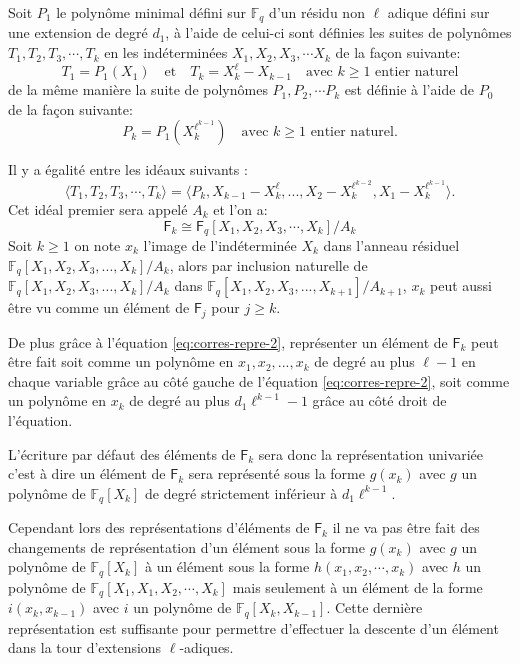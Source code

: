 \documentclass[10pt,a4paper]{book}
\theoremstyle{plain}
\theoremstyle{definition}
\theoremstyle{definition}
\theoremstyle{definition}
\theoremstyle{definition}
\theoremstyle{remark}
\theoremstyle{remark}
\theoremstyle{definition}
\begin{document}
Soit $P_1$ le polynôme minimal défini sur $\mathbb{F}_q$ d'un résidu non $\ell$ adique défini sur une extension de degré $d_1$, à l'aide de celui-ci sont définies les suites de polynômes $T_1,T_2,T_3,\cdots, T_k$ en les indéterminées $X_1,X_2,X_3, \cdots X_k$ de la façon suivante:
\[
T_1=P_1(X_1) \quad \text{et} \quad T_k=X_k^{\ell}-X_{k-1} \quad \text{avec $k \geqslant 1$ entier naturel}
\]  de la même manière la suite de polynômes $P_1,P_2, \cdots P_k$ est définie à l'aide de $P_0$ de la façon suivante:
\[
P_k=P_1(X_k^{\ell^{k-1}}) \quad \text{avec $k \geqslant 1$ entier naturel.} 
\]

Il y a égalité entre les idéaux suivants :
\begin{equation}
\label{eq:corres-repre-2}
\langle T_1, T_2, T_3, \cdots, T_k \rangle = \langle P_k, X_{k-1}-X_k^{\ell}, ..., X_2-X_{k}^{\ell^{k-2}}, X_1-X_k^{\ell^{k-1}} \rangle.
\end{equation}
Cet idéal premier sera appelé $A_k$ et l'on a:
\[
\mathsf{F}_k \cong \mathsf{F}_q[X_1,X_2,X_3,\cdots,X_k]/A_k
\]
Soit $k \geqslant 1$  on note $x_k$ l'image de l'indéterminée $X_k$ dans l'anneau résiduel $\mathbb{F}_q[X_1,X_2,X_3, ...,X_k]/A_k$, alors par inclusion naturelle de $\mathbb{F}_q[X_1,X_2,X_3, ...,X_k]/A_k$ dans $\mathbb{F}_q[X_1,X_2,X_3, ...,X_{k+1}]/A_{k+1}$, $x_k$ peut aussi être vu comme un élément de $\mathsf{F}_{j}$ pour $j \geqslant k$.

De plus grâce à l'équation \eqref{eq:corres-repre-2}, représenter un élément de $\mathsf{F}_k$ peut être fait soit comme un polynôme en $x_1,x_2, ..., x_k$ de degré au plus $\ell-1$ en chaque variable grâce au côté gauche de l'équation \eqref{eq:corres-repre-2}, soit comme un polynôme en $x_k$ de degré au plus $d_1\ell^{k-1}-1$ grâce au côté droit de l'équation.

L'écriture par défaut des éléments de $\mathsf{F}_k$ sera donc la représentation univariée c'est à dire un élément de $\mathsf{F}_k$ sera représenté sous la forme $g(x_k)$ avec $g$ un polynôme de $\mathbb{F}_q[X_k]$ de degré strictement inférieur à $d_1\ell^{k-1}$. 

Cependant lors des représentations d'éléments de $\mathsf{F}_k$ il ne va pas être fait des changements de représentation d'un élément sous la forme $g(x_k)$ avec $g$ un polynôme de $\mathbb{F}_q[X_k]$ à un élément sous la forme $h(x_1,x_2,\cdots,x_k)$ avec $h$ un polynôme de $\mathbb{F}_q[X_1,X_1,X_2,\cdots,X_k]$ mais seulement à un élément de la forme $i(x_k,x_{k-1})$ avec $i$ un polynôme de $\mathbb{F}_q[X_k,X_{k-1}]$. Cette dernière représentation est suffisante pour permettre d'effectuer la descente d'un élément dans la tour d'extensions $\ell$-adiques.
\end{document}
